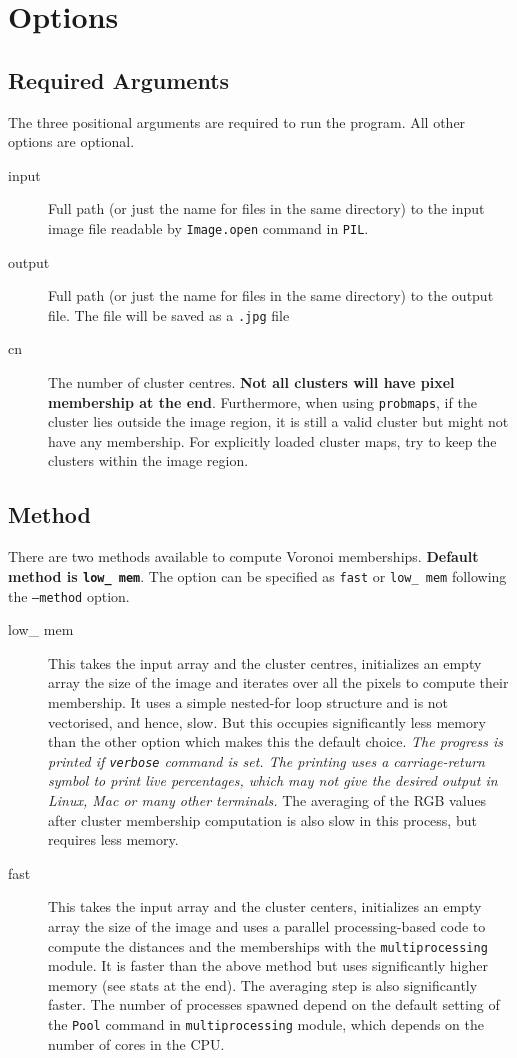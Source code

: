 \documentclass[15pt]{article}
\begin{document}
\section{Options}
\subsection{Required Arguments}
The three positional arguments are required to run the program. All other options are optional.
\begin{description}
\item [input] Full path (or just the name for files in the same directory) to the input image file readable by \texttt{Image.open} command in \texttt{PIL}.
\item [output] Full path (or just the name for files in the same directory) to the output file. The file will be saved as a \texttt{.jpg} file
\item [cn] The number of cluster centres. \textbf{Not all clusters will have pixel membership at the end}. Furthermore, when using \texttt{probmaps}, if the cluster lies outside the image region, it is still a valid cluster but might not have any membership. For explicitly loaded cluster maps, try to keep the clusters within the image region.
\end{description}
\subsection{Method}
There are two methods available to compute Voronoi memberships. \textbf{Default method is \texttt{low\_ mem}}. The option can be specified as \texttt{fast} or \texttt{low\_ mem} following the \texttt{--method} option.
\begin{description}
\item [low\_ mem] This takes the input array and the cluster centres, initializes an empty array the size of the image and iterates over all the pixels to compute their membership. It uses a simple nested-for loop structure and is not vectorised, and hence, slow. But this occupies significantly less memory than the other option which makes this the default choice. \emph{The progress is printed if \texttt{verbose} command is set. The printing uses a carriage-return symbol to print live percentages, which may not give the desired output in Linux, Mac or many other terminals.} The averaging of the RGB values after cluster membership computation is also slow in this process, but requires less memory.
\item [fast] This takes the input array and the cluster centers, initializes an empty array the size of the image and uses a parallel processing-based code to compute the distances and the memberships with the \texttt{multiprocessing} module. It is faster than the above method but uses significantly higher memory (see stats at the end). The averaging step is also significantly faster. The number of processes spawned depend on the default setting of the \texttt{Pool} command in \texttt{multiprocessing} module, which depends on the number of cores in the CPU.
\end{description}
\end{document}
